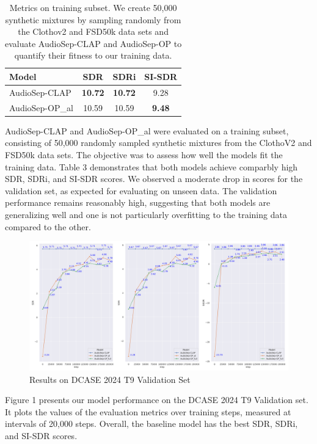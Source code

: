\documentclass[11pt]{article}
\begin{document}
\begin{table}[!htbp]
  \centering

  \begin{tabular}{lccc}
    \hline
    \textbf{Model}       & \textbf{SDR}  & \textbf{SDRi} & \textbf{SI-SDR} \\
    \hline
     AudioSep-CLAP       & \textbf{10.72} & \textbf{10.72} & 9.28   \\
     AudioSep-OP\_al     & 10.59         & 10.59         & \textbf{9.48}   \\
    \hline
  \end{tabular}
  \caption{Metrics on training subset. We create 50,000 synthetic mixtures by sampling randomly from the Clothov2 and FSD50k data sets and evaluate AudioSep-CLAP and AudioSep-OP to quantify their fitness to our training data.}
  \label{tab:accents}
\end{table}

AudioSep-CLAP and AudioSep-OP\_al were evaluated on a training subset, consisting of 50,000 randomly sampled synthetic mixtures from the ClothoV2 and FSD50k data sets. The objective was to assess how well the models fit the training data. Table 3 demonstrates that both models achieve comparbly high SDR, SDRi, and SI-SDR scores. We observed a moderate drop in scores for the validation set, as expected for evaluating on unseen data. The validation performance remains reasonably high, suggesting that both models are generalizing well and one is not particularly overfitting to the training data compared to the other.


\begin{figure}[!htbp]
  \includegraphics[width=\textwidth]{plots/validation_plots.png}
  \caption{Results on DCASE 2024 T9 Validation Set}
  \label{fig:validation_results}
\end{figure}

Figure 1 presents our model performance on the DCASE 2024 T9 Validation set. It plots the values of the evaluation metrics over training steps, measured at intervals of 20,000 steps. Overall, the baseline model has the best SDR, SDRi, and SI-SDR scores. 
\end{document}
